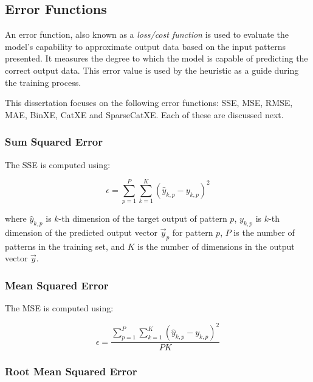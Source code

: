 \subsection{Error Functions}
\label{sec:anns:training:error_functions}

An error function, also known as a \textit{loss/cost function} is used to
evaluate the model's capability to approximate output data based on the input
patterns presented. It measures the degree to which the model is capable of
predicting the correct output data.  This error value is used by the
heuristic as a guide during the training process.

This dissertation focuses on the following error functions: \ac{SSE}, \ac{MSE},
\ac{RMSE}, \ac{MAE}, \ac{BinXE}, \ac{CatXE} and \ac{SparseCatXE}. Each of these
are discussed next.


\subsubsection{Sum Squared Error}
\label{sec:anns:training:error_functions:sse}

The \ac{SSE} is computed using:

\begin{equation}
    \epsilon = \sum_{p=1}^P \sum_{k=1}^K (\hat{y}_{k,p} - y_{k,p})^2
    \label{eq:sse}
\end{equation}

\noindent where $\hat{y}_{k,p}$ is $k$-th dimension of the target output of
pattern $p$, $y_{k,p}$ is $k$-th dimension of the predicted output vector
$\vec{y}_{p}$ for pattern $p$, $P$ is the number of patterns in the training
set, and $K$ is the number of dimensions in the output vector $\vec{y}$.


\subsubsection{Mean Squared Error}
\label{sec:anns:training:error_functions:mse}

The \ac{MSE} is computed using:

\begin{equation}
    \epsilon = \frac{\sum_{p=1}^P \sum_{k=1}^K (\hat{y}_{k,p} - y_{k,p})^2}{PK}
    \label{eq:mse}
\end{equation}


\subsubsection{Root Mean Squared Error}
\label{sec:anns:training:error_functions:rmse}

